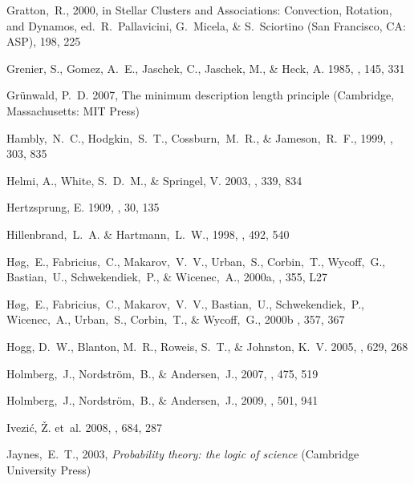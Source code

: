 \begin{thebibliography}{99}
  Gratton,~R., 2000,
  in Stellar Clusters and Associations: Convection, Rotation, and Dynamos,
  ed.~R.~Pallavicini, G.~Micela, \& S.~Sciortino (San Francisco, CA: ASP),
  198, 225


{Grenier}, S., {Gomez}, A.~E., {Jaschek}, C., {Jaschek}, M., \& {Heck}, A.
  1985, \aap, 145, 331

{Gr{\"u}nwald}, P.~D. 2007, {The minimum description length principle}
  (Cambridge, Massachusetts: {MIT Press})

  Hambly,~N.~C., Hodgkin,~S.~T., Cossburn,~M.~R., \& Jameson,~R.~F., 1999,
  \mnras, 303, 835

{Helmi}, A., {White}, S.~D.~M., \& {Springel}, V. 2003, \mnras, 339, 834

{Hertzsprung}, E. 1909, \apj, 30, 135

  Hillenbrand,~L.~A. \& Hartmann,~L.~W., 1998,
  \apj, 492, 540

  H{\o}g,~E., Fabricius,~C., Makarov,~V.~V., Urban,~S., Corbin,~T., Wycoff,~G., Bastian,~U., Schwekendiek,~P., \& Wicenec,~A., 2000a,
  \aap, 355, L27

  H{\o}g,~E., Fabricius,~C., Makarov,~V.~V., Bastian,~U., Schwekendiek,~P., Wicenec,~A., Urban,~S., Corbin,~T., \& Wycoff,~G., 2000b
    \aap, 357, 367

{Hogg}, D.~W., {Blanton}, M.~R., {Roweis}, S.~T., \& {Johnston}, K.~V. 2005,
  \apj, 629, 268

  Holmberg,~J., Nordstr\"{o}m,~B., \& Andersen,~J., 2007,
  \aap, 475, 519

  Holmberg,~J., Nordstr\"{o}m,~B., \& Andersen,~J., 2009,
  \aap, 501, 941

{Ivezi{\'c}}, {\v Z}. {et~al.} 2008, \apj, 684, 287

  Jaynes,~E.~T., 2003,
  \textit{Probability theory: the logic of science} (Cambridge University Press)


\end{thebibliography}
